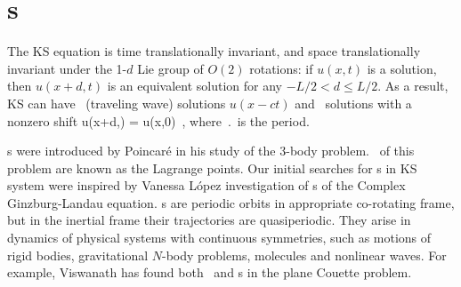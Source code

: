 \section{\Rpo s}

The KS equation   is time translationally invariant,
and
space translationally invariant
under the 1-$d$ Lie group of $O(2)$ rotations: if
$u(x,t)$ is a solution, then $u(x+d,t)$ is an equivalent
solution for any $-L/2 < d \leq L/2$.
As a result,
KS can have \reqva\ (traveling wave) solutions
$u(x-ct)$ and \rpo\ solutions with a nonzero shift
\beq
u(x+d,\period{}) = u(x,0)
\,,
where $\period{}$ is the period.


{\Rpo s} were introduced by Poincar\'e in his study of
the 3-body problem.
\Reqva\ of this problem
are known as the Lagrange points. 
Our initial searches for \rpo s in KS system were
inspired by Vanessa L{\'o}pez investigation
of {\rpo s} of the Complex Ginzburg-Landau equation.
{\Rpo s} are periodic orbits in appropriate co-rotating frame,
but in the inertial frame their trajectories
are quasiperiodic.
They arise in dynamics of physical systems
with continuous symmetries, such as motions of rigid bodies, gravitational
$N$-body problems, molecules and nonlinear waves.
For example, Viswanath %
has found both \reqva\ and \rpo s in the plane Couette problem.
